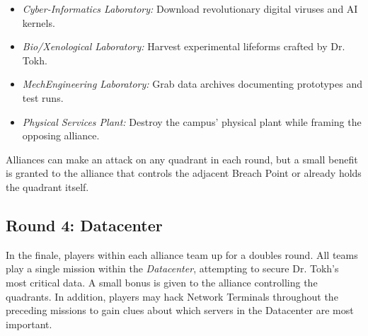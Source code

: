 \begin{itemize}
\item \textit{Cyber-Informatics Laboratory:} Download revolutionary
  digital viruses and AI kernels.
  
\item \textit{Bio/Xenological Laboratory:} Harvest experimental
  lifeforms crafted by Dr. Tokh.
  
\item \textit{MechEngineering Laboratory:} Grab data archives
  documenting prototypes and test runs.
  
\item \textit{Physical Services Plant:} Destroy the campus' physical
  plant while framing the opposing alliance.
  
\end{itemize}

Alliances can make an attack on any quadrant in each round, but a
small benefit is granted to the alliance that controls the adjacent
Breach Point or already holds the quadrant itself.

\subsection{Round 4: Datacenter}

In the finale, players within each alliance team up for a doubles
round.  All teams play a single mission within the
\textit{Datacenter}, attempting to secure Dr. Tokh's most critical
data.  A small bonus is given to the alliance controlling the
quadrants.  In addition, players may hack Network Terminals throughout
the preceding missions to gain clues about which servers in the
Datacenter are most important.
